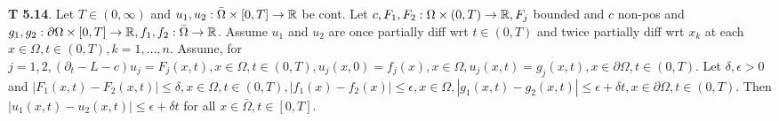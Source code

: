 {\bf T 5.14}. Let $T \in (0,\infty)$ and $u_1, u_2: \bar{\Omega}\times [0,T] \rightarrow \mathbb{R}$ be cont. Let $c, F_1, F_2: \Omega \times (0,T) \rightarrow \mathbb{R}, F_j$ bounded and $c$ non-pos and $g_1, g_2: \partial \Omega \times [0, T] \rightarrow \mathbb{R}, f_1, f_2: \bar{\Omega} \rightarrow \mathbb{R}$. Assume $u_1$ and $u_2$ are once partially diff wrt $t \in (0, T)$ and twice partially diff wrt $x_k$ at each $x \in \Omega, t \in (0, T), k = 1, \dots, n$. Assume, for $j = 1,2, (\partial_t - L - c)u_j = F_j(x,t), x \in \Omega, t \in (0,T), u_j(x,0)=f_j(x), x \in \Omega, u_j(x,t)=g_j(x,t), x \in \partial \Omega, t \in (0, T)$. Let $\delta, \epsilon > 0$ and $|F_1(x,t)-F_2(x,t)|\leq \delta, x \in \Omega, t \in (0,T), |f_1(x) - f_2(x)| \leq \epsilon, x \in \Omega, |g_1(x,t) - g_2(x,t)|\leq \epsilon + \delta t, x \in \partial \Omega, t \in (0,T)$. Then $|u_1(x,t) - u_2 (x,t)| \leq \epsilon + \delta t$ for all $x \in \bar{\Omega}, t \in [0,T]$. 
